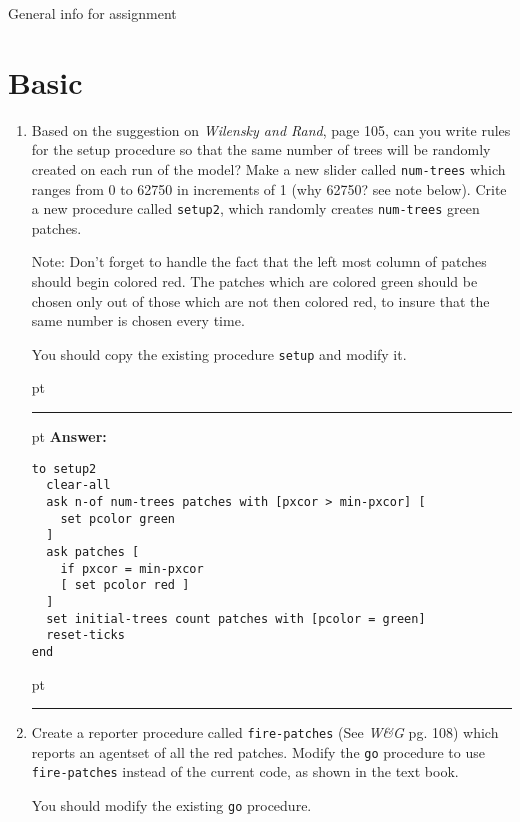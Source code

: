 \documentclass[11pt,oneside]{book}
\begin{document}
General info for assignment

\section{Basic}

\begin{enumerate}
\item Based on the suggestion on \textit{Wilensky and Rand}, page 105, can you write rules for the setup procedure so that the same number of trees will be randomly created on each run of the model? Make a new slider called \texttt{num-trees} which ranges from 0 to 62750 in increments of 1 (why 62750? see note below). Crite a new procedure called \texttt{setup2}, which randomly creates \texttt{num-trees} green patches. 

Note: Don't forget to handle the fact that the left most column of patches should begin colored red. The patches which are colored green should be chosen only out of those which are not then colored red, to insure that the same number is chosen every time.

You should copy the existing procedure \texttt{setup} and modify it.

\ifnum{}
 pt
\hrule
{} pt
{\bf Answer: }
\begin{verbatim}
to setup2
  clear-all
  ask n-of num-trees patches with [pxcor > min-pxcor] [
    set pcolor green
  ]
  ask patches [
    if pxcor = min-pxcor 
    [ set pcolor red ] 
  ]
  set initial-trees count patches with [pcolor = green]
  reset-ticks
end
\end{verbatim}
 pt
\hrule
\fi

\item Create a reporter procedure called \texttt{fire-patches} (See \textit{W\&G} pg. 108) which reports an agentset of all the red patches. Modify the \texttt{go} procedure to use \texttt{fire-patches} instead of the current code, as shown in the text book.

You should modify the existing \texttt{go} procedure.


\end{enumerate}
\end{document}
